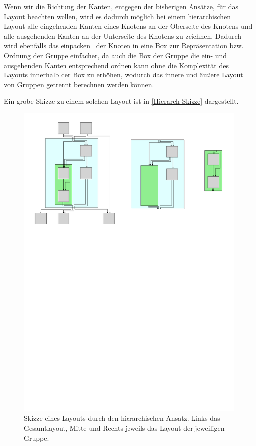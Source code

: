 Wenn wir die Richtung der Kanten, entgegen der bisherigen Ansätze, für das Layout beachten wollen, wird es dadurch möglich bei einem hierarchischen Layout alle eingehenden Kanten eines Knotens an der Oberseite des Knotens und alle ausgehenden Kanten an der Unterseite des Knotens zu zeichnen. Dadurch wird ebenfalls das \glqq einpacken \grqq\ der Knoten in eine Box zur Repräsentation bzw. Ordnung der Gruppe einfacher, da auch die Box der Gruppe die ein- und ausgehenden Kanten entsprechend ordnen kann ohne die Komplexität des Layouts innerhalb der Box zu erhöhen, wodurch das innere und äußere Layout von Gruppen getrennt berechnen werden können.

Ein grobe Skizze zu einem solchen Layout ist in \autoref{Hierarch-Skizze} dargestellt.

\begin{figure}[h!]
\begin{center}
	\includegraphics[width=\textwidth]{Pics/hierarchisch.pdf}
	\caption{Skizze eines Layouts durch den hierarchischen Ansatz. Links das Gesamtlayout, Mitte und Rechts jeweils das Layout der jeweiligen Gruppe.}
	\label{Hierarch-Skizze}
\end{center}
\end{figure}

